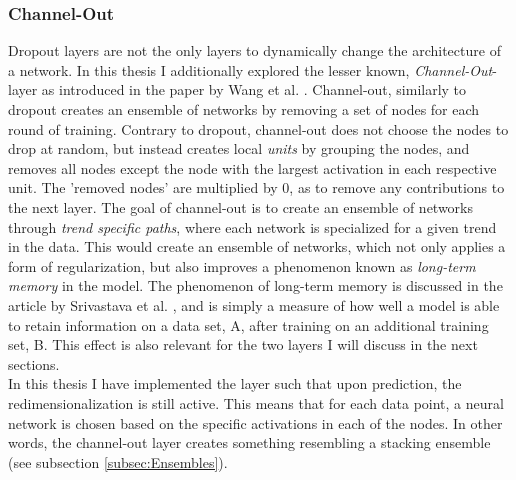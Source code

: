 \subsubsection*{Channel-Out}\label{subsubsec:Channel-Out}
Dropout layers are not the only layers to dynamically change the architecture of a network. In this thesis I additionally 
explored the lesser known, \emph{Channel-Out}-layer as introduced in the paper by Wang et al. \cite{wang_maxout_2013}. 
Channel-out, similarly to dropout creates an ensemble of networks by removing a set 
of nodes for each round of training. Contrary to dropout, channel-out does not choose the nodes to drop at random,
but instead creates local \emph{units} by grouping the nodes, and removes all nodes except the node with the largest
activation in each respective unit. The 'removed nodes' are multiplied by 0, as to remove any contributions to the next layer.
The goal of channel-out is to create an ensemble of networks through \emph{trend specific paths},
where each network is specialized for a given trend in the data. This would create an ensemble of networks, which not only applies a form of 
regularization, but also improves a phenomenon known as \emph{long-term memory} in the model. The phenomenon of long-term memory is discussed in 
the article by Srivastava et al. \cite{srivastava_compete_2013}, and is simply a measure of how well a model is able to retain information on a data set, A, after 
training on an additional training set, B. This effect is also relevant for the two layers I will discuss in the next sections.
\\
In this thesis I have implemented the layer such that upon prediction, the redimensionalization 
is still active. This means that for each data point, a neural network is chosen based on the specific activations in 
each of the nodes. In other words, the channel-out layer creates something resembling a stacking ensemble (see subsection 
\ref{subsec:Ensembles}). 
